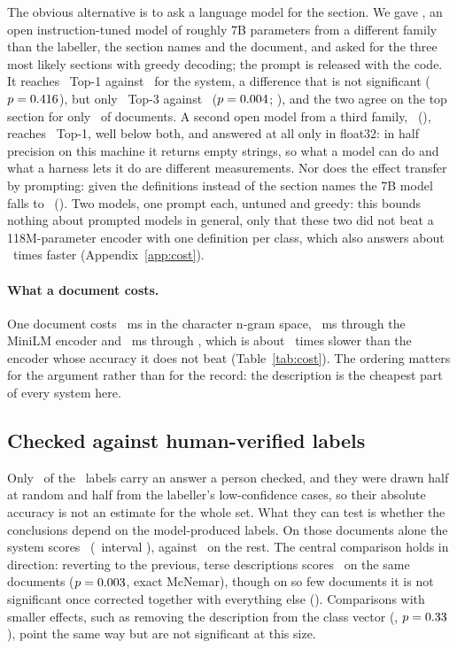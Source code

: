 \documentclass[11pt]{article}
\begin{document}
The obvious alternative is to ask a language model for the section. We gave
\LLMModel, an open instruction-tuned model of roughly 7B parameters from a
different family than the labeller, the section names and the document, and
asked for the three most likely sections with greedy decoding; the prompt is
released with the code. It reaches \LLMTopOne\ Top-1 against \OursTopOne\ for
the system, a difference that is not significant ($p = 0.416$), but only
\LLMTopThree\ Top-3 against \OursTopThree\ ($p = 0.004$;
\HolmLLMTopThreeStat), and the two agree on the top section for only
\LLMAgreeShare\ of documents. A second open model from a third family,
\LLMTwoModel\ (\LLMTwoParams), reaches \LLMTwoTopOne\ Top-1, well below both,
and answered at all only in float32: in half precision on this machine it
returns empty strings, so what a model can do and what a harness lets it do are
different measurements. Nor does the effect transfer by prompting: given the
definitions instead of the section names the 7B model falls to \LLMDefTopOne\
(\LLMDefPStat). Two models, one prompt each, untuned and greedy: this bounds
nothing about prompted models in general, only that these two did not beat a
118M-parameter encoder with one definition per class, which also answers about
\BenchLLMTimes\ times faster (Appendix~\ref{app:cost}).

\paragraph{What a document costs.}
\label{sec:cost}
One document costs \BenchCharMs~ms in the character n-gram space,
\BenchMiniLMMs~ms through the MiniLM encoder and \BenchLLMMs~ms through
\LLMModel, which is about \BenchLLMTimes\ times slower than the encoder whose
accuracy it does not beat (Table~\ref{tab:cost}). The ordering matters for
the argument rather than for the record: the description is the cheapest part of
every system here.

\subsection{Checked against human-verified labels}
\label{sec:verified}

Only \VerifyN\ of the \NEVAL\ labels carry an answer a person checked, and they
were drawn half at random and half from the labeller's low-confidence cases, so
their absolute accuracy is not an estimate for the whole set. What they can
test is whether the conclusions depend on the model-produced labels. On those
documents alone the system scores \VerifiedTopOne\ (\CILevel\ interval
\VerifiedTopOneCI), against \RestTopOne\ on the rest. The central comparison
holds in direction: reverting to the previous, terse descriptions scores
\VerifiedOldTaxTopOne\ on the same documents ($p = 0.003$, exact
McNemar), though on so few documents it is not significant once corrected
together with everything else (\HolmVerifiedStat). Comparisons with smaller
effects, such as removing the description from the class vector
(\VerifiedNoDescTopOne, $p = 0.33$), point the
same way but are not significant at this size.
\end{document}
